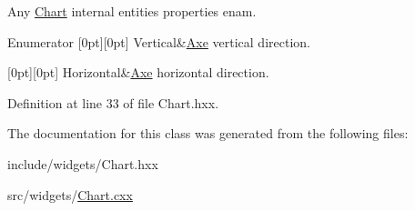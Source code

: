 Any \mbox{\hyperlink{classeven_1_1_chart}{Chart}} internal entities properties enam. 

\begin{DoxyEnumFields}{Enumerator}
[0pt][0pt]{}\mbox{\label{classeven_1_1_chart_aba4e4fe076d6d3d4682ec5e67ec68b66a3c8cf8da41fbb0ab6643cdccd343b8ee}} 
Vertical&\mbox{\hyperlink{structeven_1_1_chart_1_1_axe}{Axe}} vertical direction. \\
\hline

[0pt][0pt]{}\mbox{\label{classeven_1_1_chart_aba4e4fe076d6d3d4682ec5e67ec68b66afde75bcee70400375cc836e33ccc23d7}} 
Horizontal&\mbox{\hyperlink{structeven_1_1_chart_1_1_axe}{Axe}} horizontal direction. \\
\hline

\end{DoxyEnumFields}


Definition at line 33 of file Chart.\+hxx.



The documentation for this class was generated from the following files\+:\begin{DoxyCompactItemize}
\item 
include/widgets/Chart.\+hxx\item 
src/widgets/\mbox{\hyperlink{_chart_8cxx}{Chart.\+cxx}}\end{DoxyCompactItemize}
